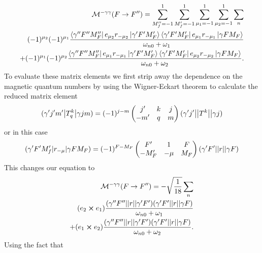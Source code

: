 \begin{equation}
\begin{split}
    \mathcal{M}^{-\gamma\gamma}(F\rightarrow F'')=
    \sum_{M_f''=-1}^1
    \sum_{M_f'=-1}^1
    \sum_{\mu_1=-1}^1
    \sum_{\mu_2=-1}^1
    \sum_{n}\\
    (-1)^{\mu_2}(-1)^{\mu_1}
    \frac{
    \bra{\gamma'' F'' M_F''}{e}_{\mu_2}
    {r}_{-\mu_2}\ket{\gamma' F' M_F'}
    \bra{\gamma' F' M_F'}{e}_{\mu_1}{r}_{-\mu_1}\ket{\gamma F M_F}}
    {\omega_{n0}+\omega_{1}}\\
    +(-1)^{\mu_1}(-1)^{\mu_2}
    \frac{
    \bra{\gamma'' F'' M_F''}{e}_{\mu_1}{r}_{-\mu_1}\ket{\gamma' F' M_F'}
    \bra{\gamma' F' M_F'}{e}_{\mu_2}{r_{-\mu_2}}\ket{\gamma F M_F}}
    {\omega_{n0}+\omega_{2}}.
    \end{split}
\end{equation}
To evaluate these matrix elements we first strip away the dependence on the magnetic quantum numbers by using the Wigner-Eckart theorem to calculate the reduced matrix element \cite{edmonds}
\begin{equation}
    (\gamma'j'm'\abs{T^k_q}\gamma jm)=(-1)^{j-m}
    \begin{pmatrix}
    j'  &k &j \\
    -m' &q &m
    \end{pmatrix}
    (\gamma'j'\abs{\abs{T^k}}\gamma j)
\end{equation}
or in this case
\begin{equation}
    (\gamma'F'M_f'\abs{r_{-\mu}}\gamma FM_F)=(-1)^{F-M_F}
    \begin{pmatrix}
    F'  &1 &F \\
    -M_F' &-\mu &M_F
    \end{pmatrix}
    (\gamma'F'\abs{\abs{r}}\gamma F)
\end{equation}
This changes our equation to
\begin{equation}
\begin{split}
    \mathcal{M}^{-\gamma\gamma}(F\rightarrow F'')=
    -\sqrt{\frac{1}{18}}\sum_{n}\\
    (e_2\cross e_1)
    \frac{
    (\gamma'' F''\abs{\abs{r}}\gamma' F')
    (\gamma' F'\abs{\abs{r}}\gamma F)}
    {\omega_{n0}+\omega_{1}}\\
    +(e_1\cross e_2)
    \frac{
    (\gamma'' F'' \abs{\abs{r}}\gamma' F')
    (\gamma' F'\abs{\abs{r}}\gamma F)}
    {\omega_{n0}+\omega_{2}}.
    \end{split}
\end{equation}
Using the fact that
